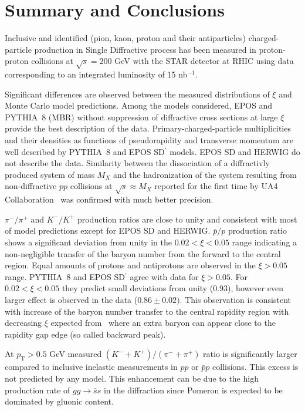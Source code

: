 \chapter{Summary and Conclusions}\label{chapter:summary}

Inclusive and identified (pion, kaon, proton and their antiparticles) charged-particle production in Single Diffractive process has been measured in proton-proton collisions at $\sqrt{s}= 200$ GeV with the STAR detector at RHIC using data corresponding to an integrated luminosity of 15 nb$^{-1}$.

Significant differences are observed between the measured distributions of $\xi$ and Monte Carlo model predictions. Among the models considered, EPOS and PYTHIA~8 (MBR) without suppression of diffractive cross sections at large $\xi$ provide the best description of the data.
Primary-charged-particle multiplicities and their densities as functions of pseudorapidity and transverse momentum are well described by PYTHIA~8 and EPOS SD$^\prime$ models. EPOS SD and HERWIG do not describe the data.
Similarity between the dissociation of a diffractivly produced system of mass $M_X$ and the hadronization of the system resulting from non-diffractive $pp$ collisions at $\sqrt{s} \approx M_X$ reported for the first time by UA4 Collaboration~\cite{ua4_diff1, UA4:intro, ua4_diff3} 
 was confirmed with much better precision.

$\pi^-/\pi^+$ and $K^-/K^+$ production ratios are close to unity and consistent with most of model predictions except for EPOS SD and HERWIG.
$\bar{p}/p$ production ratio shows a significant deviation from unity in the $0.02<\xi<0.05$ range indicating a non-negligible transfer of the baryon number from the forward to the central region. Equal amounts of protons and antiprotons are observed in the $\xi>0.05$ range. PYTHIA~8 and EPOS SD$^\prime$ agree with data for $\xi>0.05$.  For $0.02<\xi<0.05$ they predict small deviations from unity (0.93), however even larger effect is observed in the data ($0.86\pm 0.02)$. This observation is consistent with increase of the baryon number transfer to the central rapidity region with decreasing $\xi$ expected from~\cite{Bopp:2000vg} where an extra baryon can appear close to the rapidity gap edge (so called backward peak). 


At $p_{\textrm{T}}>0.5$ GeV measured $\left(K^-+K^+\right)/\left(\pi^-+\pi^+\right)$ ratio is significantly larger compared to inclusive inelastic measurements in $pp$ or $\bar{p}p$ collisions. This excess is not predicted by any model. This enhancement can be due to the high production rate of $gg\rightarrow \bar{s}s$ in the diffraction since Pomeron
is expected to be dominated by gluonic content.